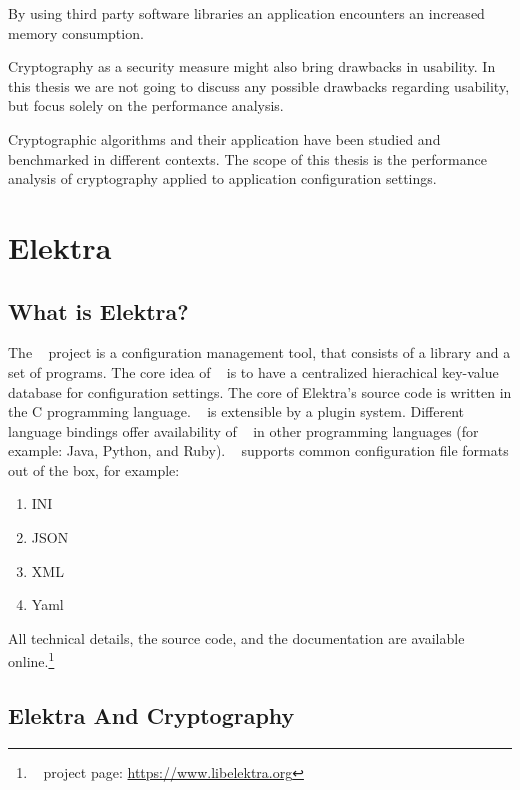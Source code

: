 By using third party software libraries an application encounters an increased memory consumption.

\label{intro-hypo-two}

Cryptography as a security measure might also bring drawbacks in usability.
In this thesis we are not going to discuss any possible drawbacks regarding usability, but focus solely on the performance analysis.

Cryptographic algorithms and their application have been studied and benchmarked in different contexts.\cite{ocf,freebsdtls,thakur2011aes}
The scope of this thesis is the performance analysis of cryptography applied to application configuration settings.

\section{Elektra}

	\subsection{What is Elektra?}

The \elektra~ project is a configuration management tool, that consists of a library and a set of programs.
The core idea of \elektra~ is to have a centralized hierachical key-value database for configuration settings.
The core of Elektra's source code is written in the C programming language.
\elektra~ is extensible by a plugin system.
Different language bindings offer availability of \elektra~ in other programming languages (for example: Java, Python, and Ruby).
\elektra~ supports common configuration file formats out of the box, for example:\cite{elektra-doc,raab2010thesis}
\begin{enumerate}
\item INI
\item JSON
\item XML
\item Yaml
\end{enumerate}

All technical details, the source code, and the documentation are available online.\footnote{\elektra~ project page: \url{https://www.libelektra.org}}

	\subsection{Elektra And Cryptography}

